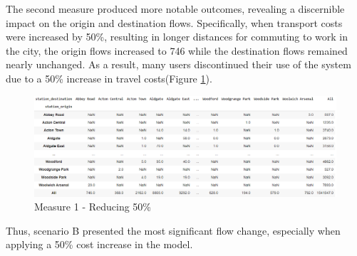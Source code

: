 \documentclass[10pt]{report}
\numberwithin{figure}{section}
\numberwithin{table}{section}
\begin{document}
The second measure produced more notable outcomes, revealing a discernible impact on the origin and destination flows. Specifically, when transport costs were increased by 50\%, resulting in longer distances for commuting to work in the city, the origin flows increased to 746 while the destination flows remained nearly unchanged. As a result, many users discontinued their use of the system due to a 50\% increase in travel costs(Figure \ref{fig:Part2_OD8_scenario B}).
    \begin{figure}[htp]
        \centering
        \includegraphics[width=16cm]{Image/Part2_OD8_scenario B.png}
        \caption{Measure 1 - Reducing 50\%}
        \label{fig:Part2_OD8_scenario B}
    \end{figure}

Thus, scenario B presented the most significant flow change, especially when applying a 50\% cost increase in the model.













\newpage
\printbibliography[title = {References}]
\end{document}
